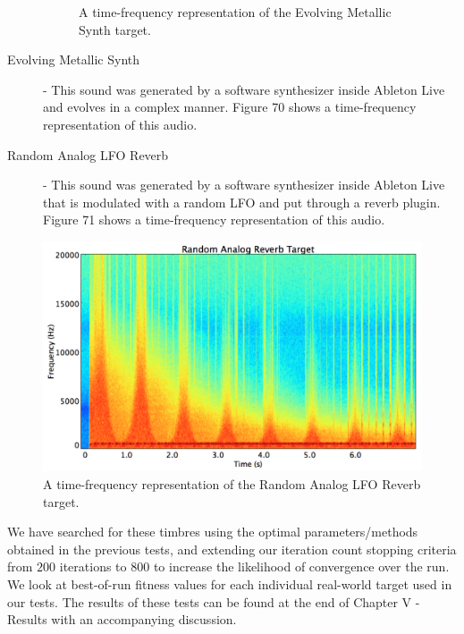 \documentclass[12pt]{report} 	%
\numberwithin{figure}{chapter}
\numberwithin{table}{chapter}
\numberwithin{equation}{chapter}
\begin{document}
\begin{flushleft}
\begin{description}
\begin{figure}[h!]
\begin{center}
\caption[Evolving metallic synth time-frequency representation]{A time-frequency representation of the Evolving Metallic Synth target.}
\end{center}
\end{figure}
\item[Evolving Metallic Synth] - This sound was generated by a software synthesizer inside Ableton Live and evolves in a complex manner. Figure 70 shows a time-frequency representation of this audio.
\item[Random Analog LFO Reverb] - This sound was generated by a software synthesizer inside Ableton Live that is modulated with a random LFO and put through a reverb plugin. Figure 71 shows a time-frequency representation of this audio.
\end{description}
\begin{figure}[h!]
\vspace{12pt}
\begin{center}
\includegraphics[scale=0.34]{RandomAnalogReverbTargetSTFT}
\caption[Random analog LFO reverb time-frequency representation]{A time-frequency representation of the Random Analog LFO Reverb target.}
\end{center}
\end{figure}
We have searched for these timbres using the optimal parameters/methods obtained in the previous tests, and extending our iteration count stopping criteria from $200$ iterations to $800$ to increase the likelihood of convergence over the run. We look at best-of-run fitness values for each individual real-world target used in our tests. The results of these tests can be found at the end of Chapter V - Results with an accompanying discussion.


\end{flushleft}
\end{document}
